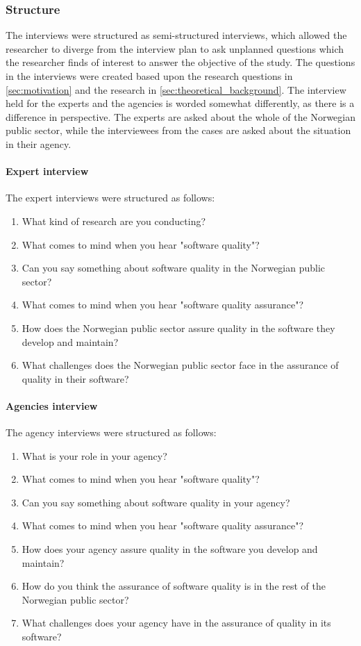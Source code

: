 \subsubsection{Structure}
The interviews were structured as semi-structured interviews, which allowed the researcher to diverge from the interview plan to ask unplanned questions which the researcher finds of interest to answer the objective of the study. The questions in the interviews were created based upon the research questions in \autoref{sec:motivation} and the research in \autoref{sec:theoretical_background}. The interview held for the experts and the agencies is worded somewhat differently, as there is a difference in perspective. The experts are asked about the whole of the Norwegian public sector, while the interviewees from the cases are asked about the situation in their agency.

\paragraph{Expert interview}
The expert interviews were structured as follows:

\begin{enumerate}
    \item What kind of research are you conducting?
    \item What comes to mind when you hear "software quality"?
    \item Can you say something about software quality in the Norwegian public sector?
    \item What comes to mind when you hear "software quality assurance"?
    \item How does the Norwegian public sector assure quality in the software they develop and maintain?
    \item What challenges does the Norwegian public sector face in the assurance of quality in their software?
\end{enumerate}

\paragraph{Agencies interview}
The agency interviews were structured as follows:

\begin{enumerate}
    \item What is your role in your agency?
    \item What comes to mind when you hear "software quality"?
    \item Can you say something about software quality in your agency?
    \item What comes to mind when you hear "software quality assurance"?
    \item How does your agency assure quality in the software you develop and maintain?
    \item How do you think the assurance of software quality is in the rest of the Norwegian public sector?
    \item What challenges does your agency have in the assurance of quality in its software?
\end{enumerate}

